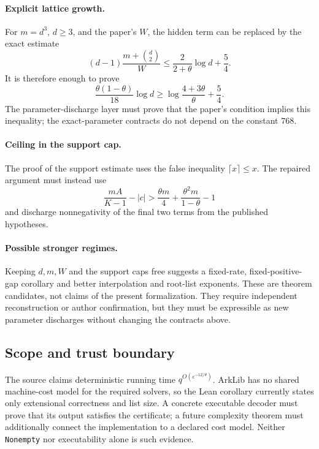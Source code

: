 \paragraph{Explicit lattice growth.}
For $m=d^3$, $d\ge3$, and the paper's $W$, the hidden term can be replaced by the exact estimate
\[
  (d-1)\frac{m+\binom d2}{W}
  \le \frac{2}{2+\theta}\log d+\frac54.
\]
It is therefore enough to prove
\[
  \frac{\theta(1-\theta)}{18}\log d
  \ge \log\frac{4+3\theta}{\theta}+\frac54.
\]
The parameter-discharge layer must prove that the paper's condition implies this inequality; the
exact-parameter contracts do not depend on the constant $768$.

\paragraph{Ceiling in the support cap.}
The proof of the support estimate uses the false inequality $\lceil x\rceil\le x$.  The repaired
argument must instead use
\[
  \frac{mA}{K-1}-|c|
  > \frac{\theta m}{4}+\frac{\theta^2m}{1-\theta}-1
\]
and discharge nonnegativity of the final two terms from the published hypotheses.

\paragraph{Possible stronger regimes.}
Keeping $d,m,W$ and the support caps free suggests a fixed-rate, fixed-positive-gap corollary and
better interpolation and root-list exponents.  These are theorem candidates, not claims of the
present formalization.  They require independent reconstruction or author confirmation, but they
must be expressible as new parameter discharges without changing the contracts above.

\subsection{Scope and trust boundary}

The source claims deterministic running time $q^{O(\varepsilon^{-12/\theta})}$.  ArkLib has no
shared machine-cost model for the required solvers, so the Lean corollary currently states only
extensional correctness and list size.  A concrete executable decoder must prove that its output
satisfies the certificate; a future complexity theorem must additionally connect the implementation
to a declared cost model.  Neither \texttt{Nonempty} nor executability alone is such evidence.

